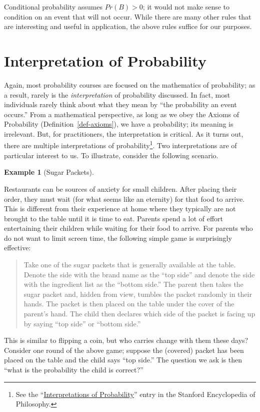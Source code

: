 \documentclass[
  letterpaper,
  DIV=11,
  numbers=noendperiod]{scrreprt}
\theoremstyle{definition}
\theoremstyle{plain}
\theoremstyle{definition}
\newtheorem{example}{Example}[chapter]
\theoremstyle{remark}
\begin{document}
Conditional probability assumes \(Pr(B) > 0\); it would not make sense
to condition on an event that will not occur. While there are many other
rules that are interesting and useful in application, the above rules
suffice for our purposes.

\hypertarget{interpretation-of-probability}{%
\section{Interpretation of
Probability}\label{interpretation-of-probability}}

Again, most probability courses are focused on the mathematics of
probability; as a result, rarely is the \emph{interpretation} of
probability discussed. In fact, most individuals rarely think about what
they mean by ``the probability an event occurs.'' From a mathematical
perspective, as long as we obey the Axioms of Probability
(Definition~\ref{def-axioms}), we have a probability; its meaning is
irrelevant. But, for practitioners, the interpretation is critical. As
it turns out, there are multiple interpretations of
probability\footnote{See the
  ``\href{https://plato.stanford.edu/archives/win2012/entries/probability-interpret/\#MaiInt}{Interpretations
  of Probability}'' entry in the Stanford Encyclopedia of Philosophy.}.
Two interpretations are of particular interest to us. To illustrate,
consider the following scenario.

\begin{example}[Sugar
Packets]\protect\hypertarget{exm-sugar}{}\label{exm-sugar}

Restaurants can be sources of anxiety for small children. After placing
their order, they must wait (for what seems like an eternity) for that
food to arrive. This is different from their experience at home where
they typically are not brought to the table until it is time to eat.
Parents spend a lot of effort entertaining their children while waiting
for their food to arrive. For parents who do not want to limit screen
time, the following simple game is surprisingly effective:

\begin{quote}
Take one of the sugar packets that is generally available at the table.
Denote the side with the brand name as the ``top side'' and denote the
side with the ingredient list as the ``bottom side.'' The parent then
takes the sugar packet and, hidden from view, tumbles the packet
randomly in their hands. The packet is then placed on the table under
the cover of the parent's hand. The child then declares which side of
the packet is facing up by saying ``top side'' or ``bottom side.''
\end{quote}

This is similar to flipping a coin, but who carries change with them
these days? Consider one round of the above game; suppose the (covered)
packet has been placed on the table and the child says ``top side.'' The
question we ask is then ``what is the probability the child is
correct?''

\end{example}
\end{document}
